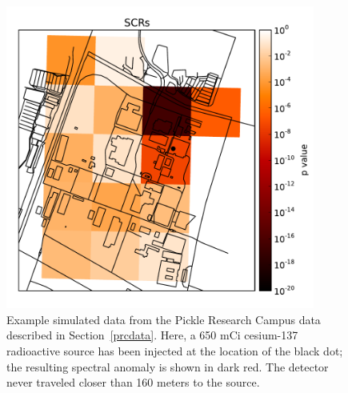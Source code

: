 \begin{figure}
  \centering
  \includegraphics[width=4in]{figures/scr-injected-prc.pdf}
  \caption{Example simulated data from the Pickle Research Campus data described
    in Section~\ref{prcdata}. Here, a 650 mCi cesium-137 radioactive source has
    been injected at the location of the black dot; the resulting spectral
    anomaly is shown in dark red. The detector never traveled closer than 160
    meters to the source.}
  \label{scr-injected-prc}
\end{figure}
